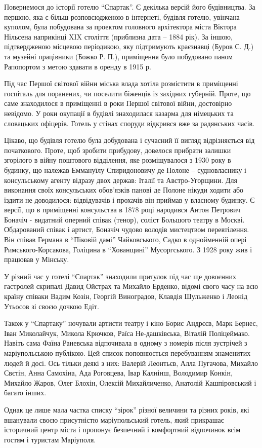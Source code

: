 
Повернемося до історії готелю \enquote{Спартак}. Є декілька версій його будівництва. За
першою, яка є більш розповсюдженою в інтернеті, будівля готелю, увінчана
куполом, була побудована за проектом головного архітектора міста Віктора
Нільсена наприкінці XIX століття (приблизна дата – 1884 рік). За іншою,
підтвердженою місцевою періодикою, яку підтримують краєзнавці (Буров С. Д.) та
музейні працівники (Божко Р. П.), приміщення було побудовано паном Рапопортом з
метою здавати в оренду в 1915 р.


Під час Першої світової війни міська влада хотіла розмістити в приміщенні
госпіталь для поранених, чи поселити біженців із західних губерній. Проте, що
саме знаходилося в приміщенні в роки Першої світової війни, достовірно
невідомо. У роки окупації в будівлі знаходилася казарма для німецьких та
словацьких офіцерів. Готель у стінах споруди відкрився вже за радянських часів.

Цікаво, що будівля готелю була добудована і сучасний її вигляд відрізняється
від початкового. Проте, щоб зробити прибудову, довелося прибрати залишки
згорілого в війну поштового відділення, яке розміщувалося з 1930 року в
будинку, що належав Еммануїлу Спиридоновичу де Полоне – судновласнику і
консульському агенту відразу двох держав: Італії та Австро-Угорщини. Для
виконання своїх консульських обов'язків панові де Полоне нікуди ходити або
їздити не доводилося: відвідувачів і прохачів він приймав у власному будинку.
Є версії, що в приміщенні консульства в 1878 році народився Антон Петрович
Боначіч - видатний оперний співак (тенор), соліст Большого театру в Москві.
Обдарований співак і артист, Боначіч чудово володів мистецтвом перевтілення.
Він співав Германа в \enquote{Піковій дамі} Чайковського, Садко в однойменній опері
Римського-Корсакова, Голіцина в \enquote{Хованщині} Мусоргського. З 1928 року жив і
працював у Мінську.


У різний час у готелі \enquote{Спартак} знаходили притулок під час ще довоєнних
гастролей скрипалі Давид Ойстрах та Михайло Ерденко, відомі свого часу на всю
країну співаки Вадим Козін, Георгій Виноградов, Клавдія Шульженко і Леонід
Утьосов зі своєю дочкою Едіт.

Також у \enquote{Спартаку} ночували артисти театру і кіно Борис Андрєєв, Марк Бернес,
Іван Миколайчук, Микола Крючков, Раїса Не\hyp{}дашківська, Віталій Поліцеймако.
Навіть сама Фаїна Раневська відпочивала в одному з номерів після зустрічей з
маріупольською публікою. Цей список поповнюється перебуванням знаменитих людей
й досі. Ось тільки деякі з них: Валерій Леонтьєв, Алла Пугачова, Михайло
Свєтін, Анна Самохіна, Ада Роговцева, Івар Калнінш, Володимир Конкін, Михайло
Жаров, Олег Блохін, Олексій Михайличенко, Анатолій Кашпіровський і багато
інших.

Однак це лише мала частка списку \enquote{зірок} різної величини та різних років, які
вшанували своєю присутністю маріупольський готель, який прикрашає історичний
центр міста і пропонує безпечний і комфортний відпочинок всім гостям і туристам
Маріуполя.

\clearpage
